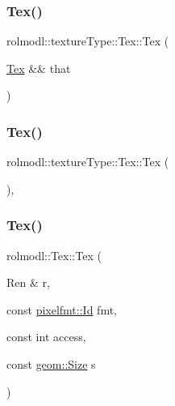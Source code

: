 \subsubsection{\texorpdfstring{Tex()}{Tex()}\hspace{0.1cm}{\footnotesize\ttfamily [2/4]}}
{\footnotesize\ttfamily rolmodl\+::texture\+Type\+::\+Tex\+::\+Tex (\begin{DoxyParamCaption}\item[{\mbox{\hyperlink{classrolmodl_1_1texture_type_1_1_tex}{Tex}} \&\&}]{that }\end{DoxyParamCaption})\hspace{0.3cm}{\ttfamily [noexcept]}}

\mbox{\label{classrolmodl_1_1texture_type_1_1_tex_abef05fe3af325cacf54158107e011c8c}} 
\subsubsection{\texorpdfstring{Tex()}{Tex()}\hspace{0.1cm}{\footnotesize\ttfamily [3/4]}}
{\footnotesize\ttfamily rolmodl\+::texture\+Type\+::\+Tex\+::\+Tex (\begin{DoxyParamCaption}{ }\end{DoxyParamCaption})\hspace{0.3cm}{\ttfamily [protected]}, {\ttfamily [noexcept]}}

\mbox{\label{classrolmodl_1_1texture_type_1_1_tex_a91a624f3ad7c4c99058901f8f79db285}} 
\subsubsection{\texorpdfstring{Tex()}{Tex()}\hspace{0.1cm}{\footnotesize\ttfamily [4/4]}}
{\footnotesize\ttfamily rolmodl\+::\+Tex\+::\+Tex (\begin{DoxyParamCaption}\item[{Ren \&}]{r,  }\item[{const \mbox{\hyperlink{namespacerolmodl_1_1pixelfmt_a96282713e4465ba9211c8fd3a702b52b}{pixelfmt\+::\+Id}}}]{fmt,  }\item[{const int}]{access,  }\item[{const \mbox{\hyperlink{structrolmodl_1_1geom_1_1_size}{geom\+::\+Size}}}]{s }\end{DoxyParamCaption})\hspace{0.3cm}{\ttfamily [protected]}}



